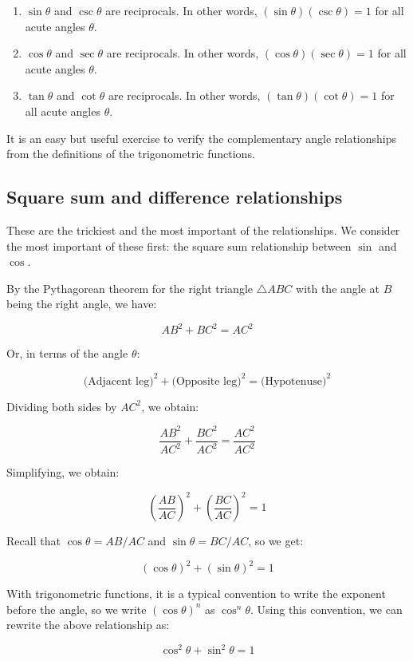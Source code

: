 \documentclass{amsart}
\begin{document}
\begin{enumerate}
\item $\sin \theta$ and $\csc \theta$ are reciprocals. In other words,
  $(\sin \theta)(\csc \theta) = 1$ for all acute angles $\theta$.
\item $\cos \theta$ and $\sec \theta$ are reciprocals. In other words,
  $(\cos \theta)(\sec \theta) = 1$ for all acute angles $\theta$.
\item $\tan \theta$ and $\cot \theta$ are reciprocals. In other words,
  $(\tan \theta)(\cot \theta) = 1$ for all acute angles $\theta$.
\end{enumerate}

It is an easy but useful exercise to verify the complementary angle
relationships from the definitions of the trigonometric functions.

\subsection{Square sum and difference relationships}

These are the trickiest and the most important of the
relationships. We consider the most important of these first: the
square sum relationship between $\sin$ and $\cos$.

By the Pythagorean theorem for the right triangle $\triangle ABC$ with
the angle at $B$ being the right angle, we have:

$$AB^2 + BC^2 = AC^2$$

Or, in terms of the angle $\theta$:

$$\text{(Adjacent leg)}^2 + \text{(Opposite leg)}^2 = \text{(Hypotenuse)}^2$$

Dividing both sides by $AC^2$, we obtain:

$$\frac{AB^2}{AC^2} + \frac{BC^2}{AC^2} = \frac{AC^2}{AC^2}$$

Simplifying, we obtain:

$$\left(\frac{AB}{AC}\right)^2 + \left(\frac{BC}{AC}\right)^2 = 1$$

Recall that $\cos \theta = AB/AC$ and $\sin \theta = BC/AC$, so we get:

$$(\cos \theta)^2 + (\sin \theta)^2 = 1$$

With trigonometric functions, it is a typical convention to write the
exponent before the angle, so we write $(\cos \theta)^n$ as
$\cos^n\theta$. Using this convention, we can rewrite the above relationship as:

$$\cos^2\theta + \sin^2\theta = 1$$
\end{document}
